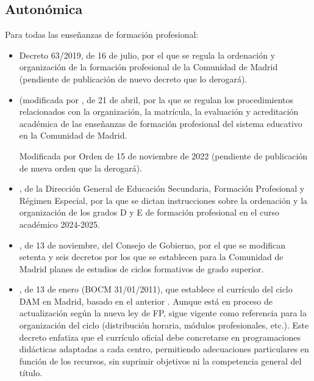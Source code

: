  \subsection*{Autonómica}
 \label{sec:normativa-autonomica}
 Para todas las enseñanzas de formación profesional:
 \begin{itemize}
     \item \label{dec:63-2019_l} Decreto 63/2019, de 16 de julio, por el que se regula la ordenación y organización de la formación profesional de la Comunidad de Madrid (pendiente de publicación de nuevo decreto que lo derogará).
 
     \item {} \label{ord:3413-2022_l} (modificada por \label{ord:3413-2022_l}, de 21 de abril, por la que se regulan los procedimientos relacionados con la organización, la matrícula, la evaluación y acreditación académica de las enseñanzas de formación profesional del sistema educativo en la Comunidad de Madrid.  

     Modificada por Orden de 15 de noviembre de 2022 (pendiente de publicación de nueva orden que la derogará).
 
     \item \label{res:4jun2024_l}, de la Dirección General de Educación Secundaria, Formación Profesional y Régimen Especial, por la que se dictan instrucciones sobre la ordenación y la organización de los grados D y E de formación profesional en el curso académico 2024-2025.
 
     \item \label{dec:103-2024_l}, de 13 de noviembre, del Consejo de Gobierno, por el que se modifican setenta y seis decretos por los que se establecen para la Comunidad de Madrid planes de estudios de ciclos formativos de grado superior.
 
     \item \label{dec:3-2011_l}, de 13 de enero (BOCM 31/01/2011), que establece el currículo del ciclo DAM en Madrid, basado en el anterior . Aunque está en proceso de actualización según la nueva ley de FP, sigue vigente como referencia para la organización del ciclo (distribución horaria, módulos profesionales, etc.). Este decreto enfatiza que el currículo oficial debe concretarse en programaciones didácticas adaptadas a cada centro, permitiendo adecuaciones particulares en función de los recursos, sin suprimir objetivos ni la competencia general del título.
 \end{itemize}

